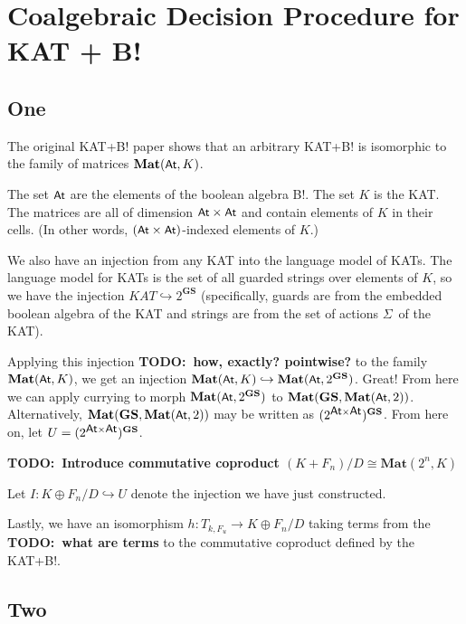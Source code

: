 \documentclass{article}
\newcommand{\atoms}{\textsf{\small{At}}}
\newcommand{\actions}{\Sigma}
\newcommand{\mat}[1]{\textbf{Mat}(#1)}
\newcommand{\gs}{\textbf{GS}}
\newcommand{\universe}{(2^{\atoms\times\atoms})^\gs}
\newcommand{\coproduct}{K \oplus F_n / D}
\newcommand{\todo}[1]{\textbf{TODO:~#1}}
\begin{document}
\section*{Coalgebraic Decision Procedure for KAT + B!}

\subsection*{One}

The original KAT+B! paper shows that an arbitrary KAT+B! is isomorphic to the family of matrices $\mat{\atoms,K}$.

The set $\atoms$ are the elements of the boolean algebra B!.
The set $K$ is the KAT.
The matrices are all of dimension $\atoms \times \atoms$ and contain elements of $K$ in their cells.
(In other words, $(\atoms \times \atoms)$-indexed elements of $K$.)


We also have an injection from any KAT into the language model of KATs.
The language model for KATs is the set of all guarded strings over elements of $K$, so we have the injection $KAT \hookrightarrow 2^\gs$ (specifically, guards are from the embedded boolean algebra of the KAT and strings are from the set of actions $\actions$~of the KAT).

Applying this injection \todo{how, exactly? pointwise?} to the family $\mat{\atoms,K}$, we get an injection $\mat{\atoms,K} \hookrightarrow \mat{\atoms,2^\gs}$.
Great!
From here we can apply currying to morph $\mat{\atoms,2^\gs}$ to $\mat{\gs,\mat{\atoms,2}}$.
Alternatively, $\mat{\gs,\mat{\atoms,2}}$ may be written as $(2^{\atoms\times\atoms})^\gs$.
From here on, let $U = \universe$.

\todo{Introduce commutative coproduct $(K + F_n) / D \cong \mat{2^n,K}$}

Let $I : \coproduct \hookrightarrow U$ denote the injection we have just constructed.

Lastly, we have an isomorphism $h : T_{k,F_u} \rightarrow \coproduct$ taking terms from the \todo{what are terms} to the commutative coproduct defined by the KAT+B!.

\subsection*{Two}
\end{document}
